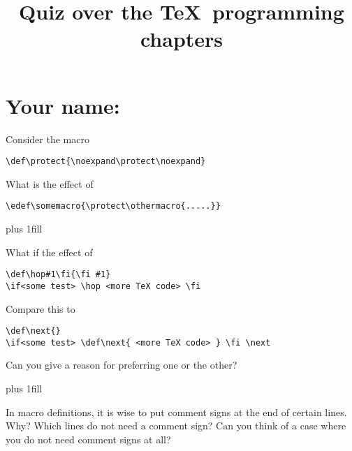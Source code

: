 \documentclass{artikel3}
\begin{document}
\pagestyle{empty}
\title{Quiz over the \TeX\ programming chapters}
\author{}\date{}\maketitle

\section*{Your name:}

\vskip3mm

Consider the macro
\begin{verbatim}
\def\protect{\noexpand\protect\noexpand}
\end{verbatim}
What is the effect of 
\begin{verbatim}
\edef\somemacro{\protect\othermacro{.....}}
\end{verbatim}

\vskip 0pt plus 1fill

What if the effect of 
\begin{verbatim}
\def\hop#1\fi{\fi #1}
\if<some test> \hop <more TeX code> \fi
\end{verbatim}
Compare this to 
\begin{verbatim}
\def\next{}
\if<some test> \def\next{ <more TeX code> } \fi \next
\end{verbatim}
Can you give a reason for preferring one or the other?

\vskip 0pt plus 1fill

In macro definitions, it is wise to put comment signs at the end of
certain lines. Why? Which lines do not need a comment sign? Can you
think of a case where you do not need comment signs at all?

\pagebreak
\end{document}
